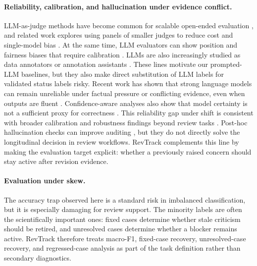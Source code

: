 \paragraph{Reliability, calibration, and hallucination under evidence conflict.}
LLM-as-judge methods have become common for scalable open-ended evaluation \citep{zheng-etal-2023-judging,liu-etal-2023-g}, and related work explores using panels of smaller judges to reduce cost and single-model bias \citep{verga-etal-2024-replacing}.
At the same time, LLM evaluators can show position and fairness biases that require calibration \citep{wang-etal-2024-large-language-models-fair}.
LLMs are also increasingly studied as data annotators or annotation assistants \citep{tan-etal-2024-large,gu-etal-2025-large}.
These lines motivate our prompted-LLM baselines, but they also make direct substitution of LLM labels for validated status labels risky.
Recent work has shown that strong language models can remain unreliable under factual pressure or conflicting evidence, even when outputs are fluent \citep{lin-etal-2022-truthfulqa,ji-etal-2023-hallucination-survey}.
Confidence-aware analyses also show that model certainty is not a sufficient proxy for correctness \citep{kadavath-etal-2022-language}.
This reliability gap under shift is consistent with broader calibration and robustness findings beyond review tasks \citep{guo-etal-2017-calibration,ovadia-etal-2019-shift,koh-etal-2021-wilds}.
Post-hoc hallucination checks can improve auditing \citep{manakul-etal-2023-selfcheckgpt}, but they do not directly solve the longitudinal decision in review workflows.
RevTrack complements this line by making the evaluation target explicit: whether a previously raised concern should stay active after revision evidence.

\paragraph{Evaluation under skew.}
The accuracy trap observed here is a standard risk in imbalanced classification, but it is especially damaging for review support.
The minority labels are often the scientifically important ones: fixed cases determine whether stale criticism should be retired, and unresolved cases determine whether a blocker remains active.
RevTrack therefore treats macro-F1, fixed-case recovery, unresolved-case recovery, and regressed-case analysis as part of the task definition rather than secondary diagnostics.
